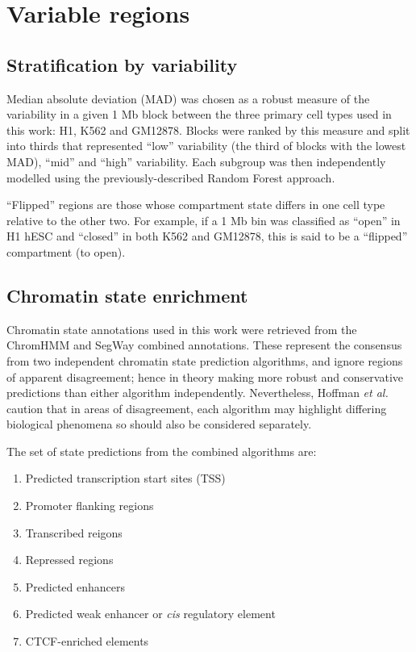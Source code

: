 \documentclass[a4paper,11pt,oneside]{book}
\begin{document}

\section{Variable regions}\label{variable-regions}

\subsection{Stratification by variability}\label{sec:variable}

Median absolute deviation (MAD) was chosen as a robust measure of the
variability in a given 1 Mb block between the three primary cell types
used in this work: H1, K562 and GM12878. Blocks were ranked by this
measure and split into thirds that represented ``low'' variability (the
third of blocks with the lowest MAD), ``mid'' and ``high'' variability.
Each subgroup was then independently modelled using the
previously-described Random Forest approach.

``Flipped'' regions are those whose compartment state differs in one
cell type relative to the other two. For example, if a 1 Mb bin was
classified as ``open'' in H1 hESC and ``closed'' in both K562 and
GM12878, this is said to be a ``flipped'' compartment (to open).

\subsection{Chromatin state enrichment}\label{enhancer-enrichment}

Chromatin state annotations used in this work were retrieved from the ChromHMM\cite{Ernst2011} and SegWay\cite{Hoffman2012} combined annotations.\cite{Hoffman2013} These represent the consensus from two independent chromatin state prediction algorithms, and ignore regions of apparent disagreement; hence in theory making more robust and conservative predictions than either algorithm independently. Nevertheless, Hoffman \emph{et al.} caution that in areas of disagreement, each algorithm may highlight differing biological phenomena so should also be considered separately.\cite{Hoffman2013}

The set of state predictions from the combined algorithms are:
\begin{enumerate}
\item Predicted transcription start sites (TSS)
\item Promoter flanking regions
\item Transcribed reigons
\item Repressed regions
\item Predicted enhancers
\item Predicted weak enhancer or \emph{cis} regulatory element
\item CTCF-enriched elements
\end{enumerate}
\end{document}
